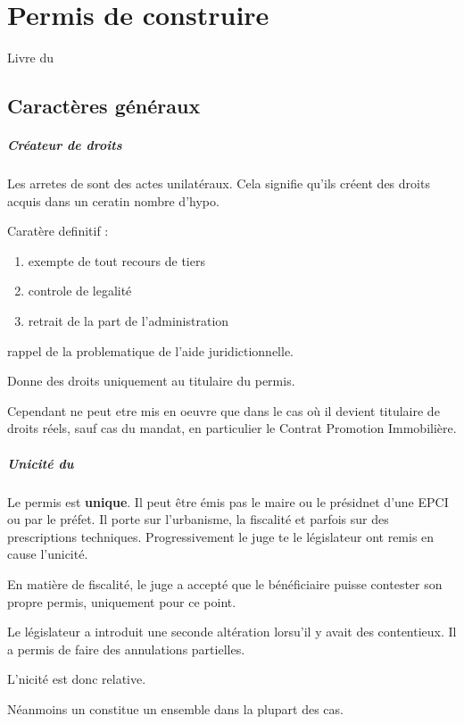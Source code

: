 \chapter{Permis de construire}

Livre \IV du \curb

\section{Caractères généraux}

	\paragraph{Créateur de droits}
	Les arretes de \PC sont des actes unilatéraux. Cela signifie qu'ils créent des droits acquis dans un ceratin nombre d'hypo.

	\medbreak Caratère definitif :
	\begin{enumerate}
		\item exempte de tout recours de tiers
		\item controle de legalité
		\item retrait de la part de l'administration
	\end{enumerate}
	rappel de la problematique de l'aide juridictionnelle.

	Donne des droits uniquement au titulaire du permis.

	Cependant ne peut etre mis en oeuvre que dans le cas où il devient titulaire de droits réels, sauf cas du mandat, en particulier le Contrat Promotion Immobilière.

	\paragraph{Unicité du \PC}
	Le permis est \textbf{unique}. Il peut être émis pas le maire ou le présidnet d'une EPCI ou par le préfet. Il porte sur l'urbanisme, la fiscalité et parfois sur des prescriptions techniques. Progressivement le juge te le législateur ont remis en cause l'unicité.

	En matière de fiscalité, le juge a accepté que le bénéficiaire puisse contester son propre permis, uniquement pour ce point.

	Le législateur a introduit une seconde altération lorsu'il y avait des contentieux. Il a permis de faire des annulations partielles.

	L'nicité est donc relative.

	\medbreak Néanmoins un \PC constitue un ensemble dans la plupart des cas.

